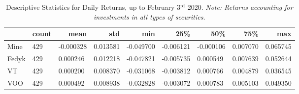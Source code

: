 \begin{appendices}
\begin{table}[ht]
\centering
\caption{Descriptive Statistics for Daily Returns, up to February 3$^\text{rd}$ 2020. 
\newline \footnotesize{\textit{Note: Returns accounting for investments in all types of securities.}}}
\begin{adjustbox}{width=\textwidth}
    \begin{tabular}{@{}l|llllllll@{}}
    \toprule
    \multicolumn{1}{r}{\textbf{}}       & \multicolumn{1}{r}{\textbf{count}} & \multicolumn{1}{r}{\textbf{mean}} & \multicolumn{1}{r}{\textbf{std}} & \multicolumn{1}{r}{\textbf{min}} & \multicolumn{1}{r}{\textbf{25\%}} & \multicolumn{1}{r}{\textbf{50\%}} & \multicolumn{1}{r}{\textbf{75\%}} & \multicolumn{1}{r}{\textbf{max}} \\ \midrule
    Mine  & 429                                & -0.000328                         & 0.013581                         & -0.049700                        & -0.006121                         & -0.000106                         & 0.007070                          & 0.065745                         \\
    Fedyk & 429                                & 0.000246                          & 0.012218                         & -0.047821                        & -0.005735                         & 0.000549                          & 0.007639                          & 0.052644                         \\
    VT    & 429                                & 0.000200                          & 0.008370                         & -0.031068                        & -0.003812                         & 0.000766                          & 0.004879                          & 0.036545                         \\
    VOO   & 429                                & 0.000492                          & 0.008938                         & -0.032828                        & -0.003072                         & 0.000783                          & 0.005103                          & 0.049350                         \\
        \end{tabular}
\end{adjustbox}
\label{tab:returns_st_before}
\end{table}
    

\end{appendices}
